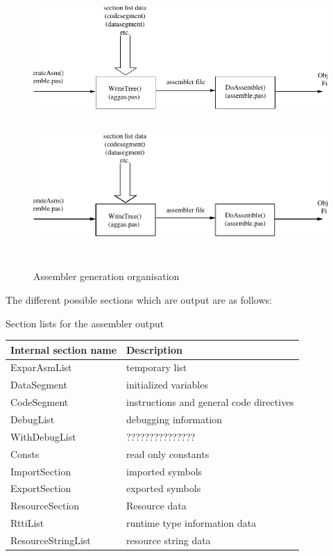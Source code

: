 \documentclass [a4paper,12pt]{article}
\begin{document}
\begin{figure}
\ifpdf
\includegraphics{arch11.pdf}
\else
\includegraphics[width=5.67in,height=2.17in]{arch11.eps}
\fi
\label{fig:fig11}
\caption{Assembler generation organisation}
\end{figure}

\clearpage

The different possible sections which are output are as follows:

\begin{center}
Section lists for the assembler output
\end{center}

\begin{longtable}{|l|p{10cm}|}
\hline
Internal section name & Description \\
\hline
\endhead
\hline
\endfoot
ExparAsmList    & temporary list \\
DataSegment     & initialized variables \\
CodeSegment     & instructions and general code directives \\
DebugList       & debugging information \\
WithDebugList   & ??????????????? \\
Consts          & read only constants \\
ImportSection   & imported symbols \\
ExportSection   & exported symbols \\
ResourceSection & Resource data \\
RttiList        & runtime type information data \\
ResourceStringList& resource string data
\end{longtable}
\end{document}
